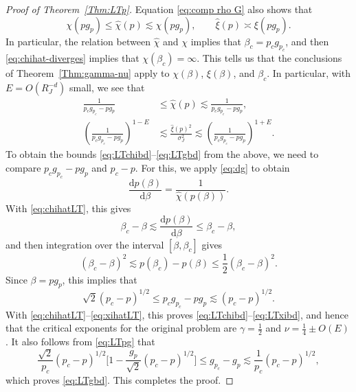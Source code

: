 \documentclass[11pt,a4paper]{article}
\numberwithin{equation}{section}
\theoremstyle{plain}
\theoremstyle{definition}
\newcommand\1{\mathds{1}}
\begin{document}
\begin{proof}[Proof of Theorem~\textup{\ref{Thm:LTp}}]
Equation \eqref{eq:comp rho G} also shows that
\begin{equation}
    \chi(pg_p) \le \hat\chi(p) \lesssim \chi(pg_p),
    \qquad
    \hat\xi(p) \asymp \xi(pg_p).
\end{equation}
In particular, the relation between $\hat\chi$ and $\chi$ implies that
$\beta_c=p_cg_{p_c}$, and then \eqref{eq:chihat-diverges} implies that $\chi(\beta_c)=\infty$.   This tells us that the conclusions of Theorem~\ref{Thm:gamma-nu} apply to $\chi(\beta)$, $\xi(\beta)$, and $\beta_c$.
In particular, with $E=O(R_J^{-d})$ small, we
see that
 \begin{align}
 \label{eq:chihatLT}
    \frac{1}{p_cg_{p_c}-pg_p}
    &\le \hat{\chi}(p)
    \lesssim
    \frac{1}{p_cg_{p_c}-pg_p },
\\
    \left( \frac{1}{p_cg_{p_c}-pg_p} \right)^{1-E}
    &\lesssim
    \frac{\hat{\xi}(p)^2}{\sigma_J^2}
    \lesssim
    \left( \frac{1}{p_cg_{p_c}-pg_p} \right)^{1+E}
    .
\label{eq:xihatLT}
 \end{align}
To obtain the bounds \eqref{eq:LTchibd}--\eqref{eq:LTgbd} from the above,
we need to compare $p_c g_{p_c}-p g_p$ and $p_c-p$.
For this, we apply \eqref{eq:dg} to obtain
\begin{equation}
    \frac{ \mathrm{d} p(\beta)}{\mathrm{d}\beta} = \frac{1}{\hat{\chi}(p(\beta) )}.
\end{equation}
With \eqref{eq:chihatLT}, this gives
\begin{equation}
    \beta_c-\beta\lesssim
     \frac{ \mathrm{d} p(\beta)}{\mathrm{d}\beta}
     \leq \beta_c-\beta,
\end{equation}
and then integration over the interval $[\beta,\beta_c]$ gives
\begin{equation}
    (\beta_c-\beta)^2\lesssim p(\beta_c)-p(\beta) \le \frac{1}{2} (\beta_c-\beta)^2.
\end{equation}
Since $\beta   = pg_p$, this implies that
\begin{equation}
\label{eq:LTpg}
    \sqrt{2}(p_c-p)^{1/2}\leq p_c g_{p_c}-p g_p \lesssim (p_c-p)^{1/2}.
\end{equation}
With \eqref{eq:chihatLT}--\eqref{eq:xihatLT}, this proves \eqref{eq:LTchibd}--\eqref{eq:LTxibd}, and hence that the critical
exponents
for the original problem are $\gamma= \frac 12$ and $\nu = \frac 14 \pm O(E)$.
It also follows from \eqref{eq:LTpg} that
\begin{equation}
    \frac{\sqrt{2}}{p_c}(p_c-p)^{1/2}\Big[ 1 - \frac{g_p}{\sqrt{2}}(p_c-p)^{1/2} \Big]
    \le
    g_{p_c}-g_p
    \lesssim \frac{1}{p_c} (p_c-p)^{1/2},
\end{equation}
which proves \eqref{eq:LTgbd}.
This completes the proof.
\end{proof}
\end{document}

